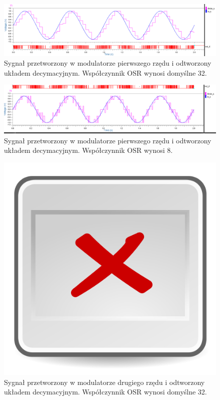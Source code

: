 \documentclass[13pt, a4paper, twoside]{mwart}
\begin{document}
\begin{figure}[H]
	\centering
  \includegraphics[width=0.9\linewidth]{inv/sigma_delta_decymator.png}
  \caption{Sygnał przetworzony w modulatorze pierwszego rzędu i odtworzony układem decymacyjnym. Współczynnik OSR wynosi domyślne 32.}
\end{figure}

\begin{figure}[H]
	\centering
  \includegraphics[width=0.9\linewidth]{inv/sigma_delta_decymator_osr8.png}
  \caption{Sygnał przetworzony w modulatorze pierwszego rzędu i odtworzony układem decymacyjnym. Współczynnik OSR wynosi 8.}
\end{figure}

\begin{figure}[H]
	\centering
  \includegraphics[width=0.2\linewidth]{image-missing.png}
  \caption{Sygnał przetworzony w modulatorze drugiego rzędu i odtworzony układem decymacyjnym. Współczynnik OSR wynosi domyślne 32.}
\end{figure}

\end{document}
